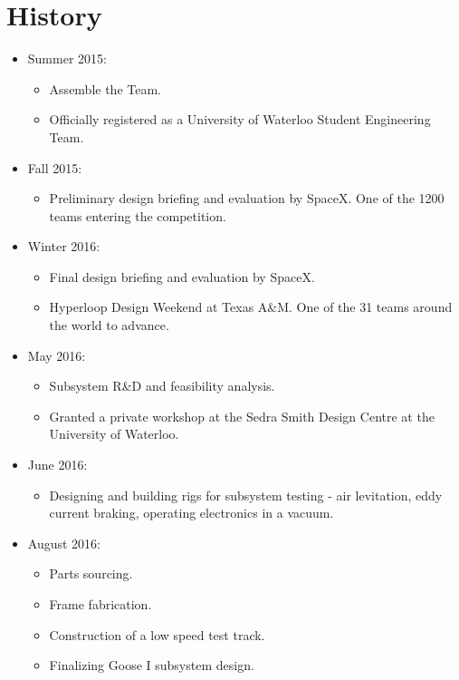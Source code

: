 \documentclass[11pt,a4paper,oldfontcommands]{memoir}
\begin{document}
\section{History}
\begin{itemize}
    
    \item Summer 2015:
    \begin{itemize}
        \item Assemble the Team.
        \item Officially registered as a University of Waterloo Student Engineering Team.
    \end{itemize}
    
    \item Fall 2015:
    \begin{itemize}
        \item Preliminary design briefing and evaluation by SpaceX. One of the 1200 teams entering the competition.
    \end{itemize}
    
    \item Winter 2016:
    \begin{itemize}
        \item Final design briefing and evaluation by SpaceX.
        \item Hyperloop Design Weekend at Texas A\&M. One of the 31 teams around the world to advance.
    \end{itemize}
    
    \item May 2016:
    \begin{itemize}
        \item Subsystem R\&D and feasibility analysis.
        \item Granted a private workshop at the Sedra Smith Design Centre at the University of Waterloo.
    \end{itemize}
    
    \item June 2016:
    \begin{itemize}
        \item Designing and building rigs for subsystem testing - air levitation, eddy current braking, operating electronics in a vacuum.
    \end{itemize}
    
    \item August 2016:
    \begin{itemize}
        \item Parts sourcing.
        \item Frame fabrication.
        \item Construction of a low speed test track.
        \item Finalizing Goose I subsystem design.
    \end{itemize}
    

\end{itemize}
\end{document}

